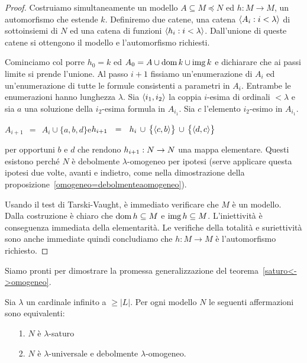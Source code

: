 \begin{proof}
Costruiamo simultaneamente un modello $A\subseteq M\preceq N$ ed $h:M\to M$, un automorfismo che estende $k$. Definiremo due catene, una catena $\langle A_i:i<\lambda\rangle$ di sottoinsiemi di $N$ ed una catena di funzioni $\langle h_i:i<\lambda\rangle$. Dall'unione di queste catene si ottengono il modello e l'automorfismo richiesti.

Cominciamo col porre $h_0=k$ ed $A_0=A\cup\mathop{\rm dom} k\cup\mathop{\rm img} k$ e dichiarare che ai passi limite si prende l'unione. Al passo $i+1$ fissiamo un'enumerazione di $A_i$ ed un'enumerazione di tutte le formule consistenti a parametri in $A_i$. Entrambe le enumerazioni hanno lunghezza $\lambda$.  Sia $\langle i_1,i_2\rangle$ la coppia $i$-esima di ordinali $<\lambda$ e sia $a$ una soluzione della $i_2$-esima formula in $A_{i_1}$. Sia $c$ l'elemento $i_2$-esimo in $A_{i_1}$.

\hfil $A_{i+1}\ \ =\ \ A_i\cup\big\{a,b,d\big\}$\hfil  e\hfil  $h_{i+1}\ \ =\ \ h_i\,\cup\,\big\{\<c,b\>\big\}\,\cup\,\big\{\<d,c\>\big\}$ 

per opportuni $b$ e $d$ che rendono $h_{i+1}:N\rightarrow N$ una mappa elementare. Questi esistono perch\'e $N$ \`e debolmente $\lambda$-omogeneo per ipotesi (serve applicare questa ipotesi due volte, avanti e indietro, come nella dimostrazione della proposizione~\ref{omogeneo=debolmenteaomogeneo}).

Usando il test di Tarski-Vaught, \`e immediato verificare che $M$ \`e un modello. Dalla costruzione \`e chiaro che $\mathop{\rm dom} h\subseteq M$ e $\mathop{\rm img} h\subseteq M$. L'iniettivit\`a \`e conseguenza immediata della elementarit\`a. Le verifiche della totalit\`a e suriettivit\`a sono anche immediate quindi concludiamo che $h:M\to M$ \`e l'automorfismo richiesto.
\end{proof}


Siamo pronti per dimostrare la promessa generalizzazione del teorema~\ref{saturo<->omogeneo}.


\begin{theorem}\label{saturo=universaledebolmenteomogeneo}
Sia $\lambda$ un cardinale infinito a $\ge|L|$.  Per ogni modello $N$ le seguenti affermazioni sono equivalenti:
\begin{itemize}
\item[1.] $N$ \`e $\lambda$-saturo
\item[2.] $N$ \`e $\lambda$-universale e debolmente $\lambda$-omogeneo.
\end{itemize}
\end{theorem}

